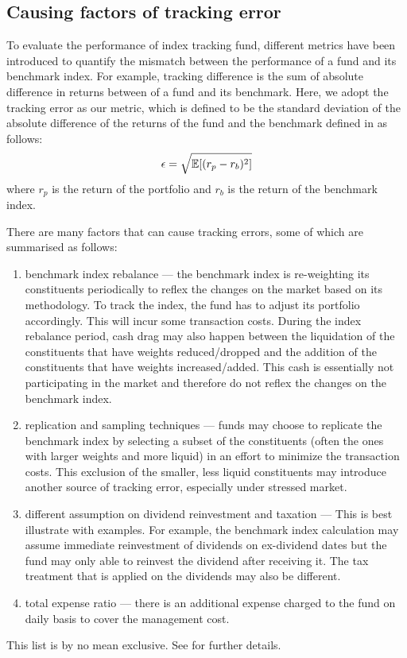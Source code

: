 \subsection{Causing factors of tracking error}
To evaluate the performance of index tracking fund, different metrics have been introduced to quantify the mismatch between the performance of a fund and its benchmark index. For example, tracking difference is the sum of absolute difference in returns between of a fund and its benchmark. Here, we adopt the tracking error as our metric, which is defined to be the standard deviation of the absolute difference of the returns of the fund and the benchmark defined in \cite{BJ13} as follows:
\begin{equation}
  \epsilon = \sqrt{\operatorname{\mathbb{E}}[(r_p - r_b)^2]}
\end{equation}
where $r_p$ is the return of the portfolio and $r_b$ is the return of the benchmark index.
 
There are many factors that can cause tracking errors, some of which are summarised as follows:
\begin{enumerate}
\item benchmark index rebalance --- the benchmark index is re-weighting its constituents periodically to reflex the changes on the market based on its methodology. To track the index, the fund has to adjust its portfolio accordingly. This will incur some transaction costs. During the index rebalance period, cash drag may also  happen between the liquidation of the constituents that have weights reduced/dropped and the addition of the constituents that have weights increased/added. This cash is essentially not participating in the market and therefore do not reflex the changes on the benchmark index.
\item replication and sampling techniques --- funds may choose to replicate the benchmark index by selecting a subset of the constituents (often the ones with larger weights and more liquid) in an effort to minimize the transaction costs. This exclusion of the smaller, less liquid constituents may introduce another source of tracking error, especially under stressed market.
\item different assumption on dividend reinvestment and taxation --- This is best illustrate with examples. For example, the benchmark index calculation may assume immediate reinvestment of dividends on ex-dividend dates but the fund may only able to reinvest the dividend after receiving it. The tax treatment that is applied on the dividends may also be different.
\item total expense ratio --- there is an additional expense charged to the fund on daily basis to cover the management cost.
\end{enumerate}
This list is by no mean exclusive. See \cite{BJ13} for further details.
 

